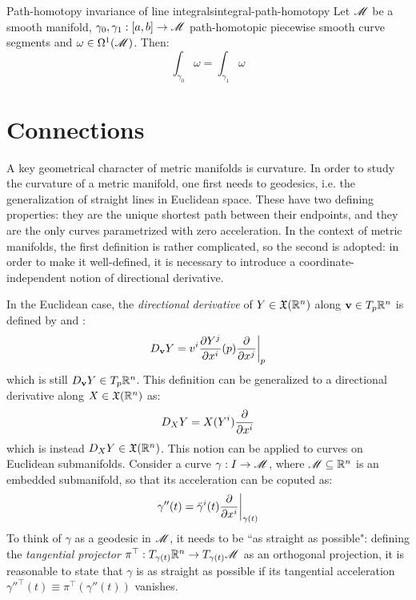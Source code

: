 \begin{theorem}{Path-homotopy invariance of line integrals}{integral-path-homotopy}
  Let $ \mathscr{M} $ be a smooth manifold, $ \gamma_0 , \gamma_1 : [a,b] \rightarrow \mathscr{M} $ path-homotopic piecewise smooth curve segments and $ \omega \in \Omega^{1}(\mathscr{M}) $. Then:
  \begin{equation*}
    \int_{\gamma_0} \omega = \int_{\gamma_1} \omega
  \end{equation*}
\end{theorem}

\section{Connections}

A key geometrical character of metric manifolds is curvature. In order to study the curvature of a metric manifold, one first needs to geodesics, i.e. the generalization of straight lines in Euclidean space. These have two defining properties: they are the unique shortest path between their endpoints, and they are the only curves parametrized with zero acceleration. In the context of metric manifolds, the first definition is rather complicated, so the second is adopted: in order to make it well-defined, it is necessary to introduce a coordinate-independent notion of directional derivative.

In the Euclidean case, the \emph{directional derivative} of $ Y \in \mathfrak{X}(\mathbb{R}^n) $ along $ \mathbf{v} \in T_p\mathbb{R}^n $ is defined by  and :
\begin{equation*}
  D_{\mathbf{v}} Y = v^i \frac{\partial Y^j}{\partial x^i} (p) \frac{\partial}{\partial x^j} \bigg\vert_p
\end{equation*}
which is still $ D_{\mathbf{v}} Y \in T_p\mathbb{R}^n $. This definition can be generalized to a directional derivative along $ X \in \mathfrak{X}(\mathbb{R}^n) $ as:
\begin{equation}
  D_X Y = X(Y^i) \frac{\partial}{\partial x^i}
\end{equation}
which is instead $ D_X Y \in \mathfrak{X}(\mathbb{R}^n) $. This notion can be applied to curves on Euclidean submanifolds. Consider a curve $ \gamma : I \rightarrow \mathscr{M} $, where $ \mathscr{M} \subseteq \mathbb{R}^n $ is an embedded submanifold, so that its acceleration can be coputed as:
\begin{equation*}
  \gamma''(t) = \ddot{\gamma}^i(t) \frac{\partial}{\partial x^i} \bigg\vert_{\gamma(t)}
\end{equation*}
To think of $ \gamma $ as a geodesic in $ \mathscr{M} $, it needs to be ``as straight as possible": defining the \emph{tangential projector} $ \pi^\top : T_{\gamma(t)}\mathbb{R}^n \rightarrow T_{\gamma(t)}\mathscr{M} $ as an orthogonal projection, it is reasonable to state that $ \gamma $ is as straight as possible if its tangential acceleration $ {\gamma''}^\top(t) \equiv \pi^\top(\gamma''(t)) $ vanishes.

